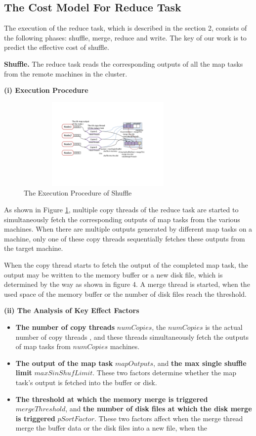 \subsection{The Cost Model For Reduce Task}
The execution of the reduce task, which is described in the section 2, consists of the following phases: shuffle, merge, reduce and write. The key of our work is to predict the effective cost of shuffle.

\noindent\textbf{Shuffle.} The reduce task reads the corresponding outputs of all the map tasks from the remote machines in the cluster.

\noindent\textbf{(i) Execution Procedure}
\begin{figure}[htbp]
\centering
\includegraphics[height=4.5cm, width=9cm]{shuffle}
\caption{The Execution Procedure of Shuffle}
\label{fig:proce}
\end{figure}

As shown in Figure \ref{fig:proce}, multiple copy threads of the reduce task are started to simultaneously fetch the corresponding outputs of map tasks from the various machines. When there are multiple outputs generated by different map tasks on a machine, only one of these copy threads sequentially fetches these outputs from the target machine.

When the copy thread starts to fetch the output of the completed map task, the output may be written to the memory buffer or a new disk file, which is determined by the way as shown in figure 4. A merge thread is started, when the used space of the memory buffer or the number of disk files reach the threshold.

\noindent\textbf{(ii) The Analysis of Key Effect Factors}
\begin{itemize}
\item \textbf{The number of copy threads} $numCopies$, the $numCopies$ is the actual number of copy threads , and these threads simultaneously fetch the outputs of map tasks from $numCopies$ machines.
\item \textbf{The output of the map task} $mapOutputs$, and \textbf{the max single shuffle limit} $maxSinShufLimit$. These two factors determine whether the map task's output is fetched into the buffer or disk.
\item \textbf{The threshold at which the memory merge is triggered} $mergeThreshold$, and \textbf{the number of disk files at which the disk merge is triggered} $pSortFactor$. These two factors affect when the merge thread merge the buffer data or the disk files into a new file, when the 
\end{itemize}

